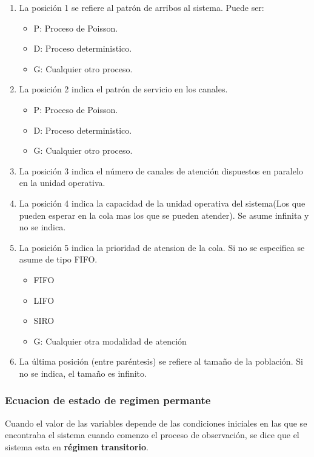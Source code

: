 \documentclass{article}
\begin{document}
\begin{enumerate}
    \item La posición 1 se refiere al patrón de arribos al sistema. Puede ser:
    \begin{itemize}
        \item P: Proceso de Poisson.
        \item D: Proceso deterministico.
        \item G: Cualquier otro proceso.
    \end{itemize}
    \item La posición 2 indica el patrón de servicio en los canales.
    \begin{itemize}
        \item P: Proceso de Poisson.
        \item D: Proceso deterministico.
        \item G: Cualquier otro proceso.
    \end{itemize}
    \item La posición 3 indica el número de canales de atención dispuestos en paralelo en la unidad operativa.
    \item La posición 4 indica la capacidad de la unidad operativa del sistema(Los que pueden esperar en la cola mas los que se pueden atender). Se asume infinita y no se indica.
    \item La posición 5 indica la prioridad de atension de la cola.  Si no se especifica se asume de tipo FIFO.
    \begin{itemize}
        \item FIFO
        \item LIFO
        \item SIRO
        \item G: Cualquier otra modalidad de atención
    \end{itemize}
    \item La última posición (entre paréntesis) se refiere al tamaño de la población. Si no se indica, el tamaño es infinito.
\end{enumerate}


\subsubsection{Ecuacion de estado de regimen permante}

Cuando el valor de las variables depende de las condiciones iniciales en las que se encontraba el sistema
cuando comenzo el proceso de observación, se dice que el sistema esta en \textbf{régimen transitorio}.
\end{document}

